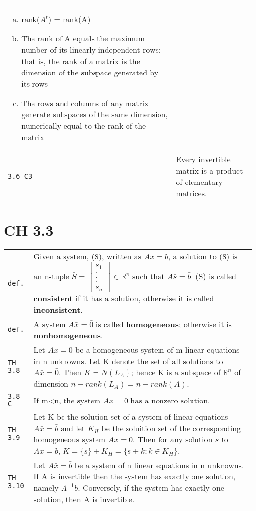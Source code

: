 \documentclass[10pt,landscape]{article}
\begin{document}
\begin{multicols}{3}
\begin{tabular}{@{}p{\the\MyLen}%
                @{}p{\linewidth-\the\MyLen}@{}}
               \begin{enumerate}[a)]
               \item rank($A^t$) = rank(A)
               \item The rank of A equals the maximum number of its linearly independent rows; that is, the rank of a matrix is the dimension of the subspace generated by its rows
               \item The rows and columns of any matrix generate subspaces of the same dimension, numerically equal to the rank of the matrix
               \end{enumerate}\\
\verb!3.6 C3! & Every invertible matrix is a product of elementary matrices.\\
\end{tabular}

\section{CH 3.3}
\begin{tabular}{@{}p{\the\MyLen}%
                @{}p{\linewidth-\the\MyLen}@{}} %
\verb!def.! & Given a system, (S), written as $A\bar{x} = \bar{b}$, a solution to (S) is an n-tuple $\bar{S} = \begin{bmatrix} s_1 \\ . \\ . \\ . \\ s_n \end{bmatrix} \in\mathbb{R}^n$ 
             such that $A\bar{s}=\bar{b}$. (S) is called \textbf{consistent} if it has a solution, otherwise it is called \textbf{inconsistent}.\\
\verb!def.! & A system $A\bar{x} = \bar{0}$ is called \textbf{homogeneous}; otherwise it is \textbf{nonhomogeneous}.\\
\verb!TH 3.8! & Let $A\bar{x} =\bar{0}$ be a homogeneous system of m linear equations in n unknowns. Let K denote the set of all solutions to $A\bar{x} =\bar{0}$. Then $K=N(L_A)$; hence
               K is a subspace of $\mathbb{R}^n$ of dimension  $n - rank(L_A) = n - rank(A)$.\\
\verb!3.8 C! & If m<n, the system $A\bar{x}=\bar{0}$ has a nonzero solution.\\
\verb!TH 3.9! & Let K be the solution set of a system of linear equations $A\bar{x}=\bar{b}$ and let $K_H$ be the soluition set of the corresponding homogeneous system $A\bar{x}=\bar{0}$.
               Then for any solution $\bar{s}$ to $A\bar{x}=\bar{b}$, $K = \{\bar{s}\} + K_H = \{\bar{s} + \bar{k}: \bar{k}\in K_H\}$.\\
\verb!TH 3.10! & Let $A\bar{x}=\bar{b}$ be a system of n linear equations in n unknowns. If A is invertible then the system has exactly one solution, namely $A^{-1}\bar{b}$. Conversely,
                if the system has exactly one solution, then A is invertible.\\
\end{tabular}


\end{multicols}
\end{document}

